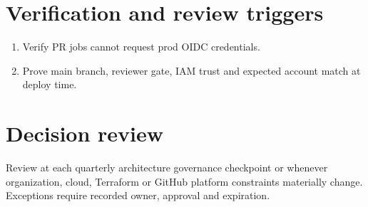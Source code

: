 \documentclass[11pt]{article}
\begin{document}
\section*{Verification and review triggers}
\begin{enumerate}[leftmargin=*]
\item Verify PR jobs cannot request prod OIDC credentials.
\item Prove main branch, reviewer gate, IAM trust and expected account match at deploy time.
\end{enumerate}
\section*{Decision review}
Review at each quarterly architecture governance checkpoint or whenever organization, cloud, Terraform or GitHub platform constraints materially change. Exceptions require recorded owner, approval and expiration.
\end{document}
